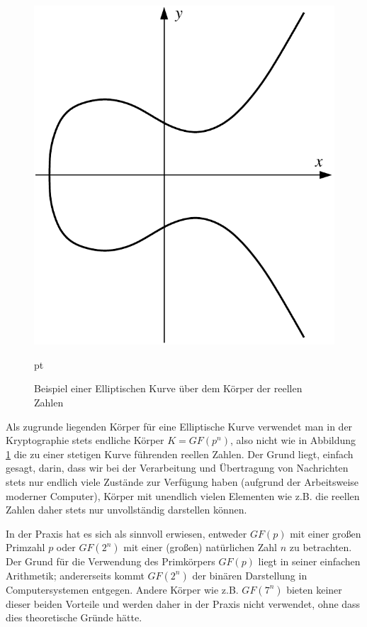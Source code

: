 \begin{refsegment}
\begin{figure}[ht]
\begin{center}
\includegraphics[scale=0.60]{figures/elliptic-curve}
\caption{Beispiel einer Elliptischen Kurve über dem Körper der reellen Zahlen}
\label{ExampleEllipticCurve}
\end{center}
 pt
\end{figure}
Als zugrunde liegenden Körper für eine Elliptische Kurve verwendet man in der Kryptographie stets endliche Körper $K=GF(p^n)$, also nicht wie in Abbildung \ref{ExampleEllipticCurve} die zu einer stetigen Kurve führenden reellen Zahlen. Der Grund liegt, einfach gesagt, darin, dass wir bei der Verarbeitung und Übertragung von Nachrichten stets nur endlich viele Zustände zur Verfügung haben (aufgrund der Arbeitsweise moderner Computer), Körper mit unendlich vielen Elementen wie z.B. die reellen Zahlen daher stets nur unvollständig darstellen können.

In der Praxis hat es sich als sinnvoll erwiesen, entweder $GF(p)$ mit einer großen Primzahl $p$ oder $GF(2^n)$ mit einer (großen) natürlichen Zahl $n$ zu betrachten. Der Grund für die Verwendung des Primkörpers $GF(p)$ liegt in seiner einfachen Arithmetik; andererseits kommt $GF(2^n)$ der binären Darstellung in Computersystemen entgegen. Andere Körper wie z.B. $GF(7^n)$ bieten keiner dieser beiden Vorteile und werden daher in der Praxis nicht verwendet, ohne dass dies theoretische Gründe hätte.


\end{refsegment}
